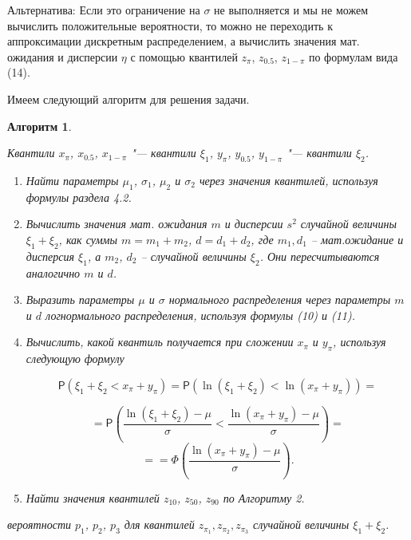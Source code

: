 \documentclass[12pt]{article}
\newtheorem{alg}{Алгоритм}
\newenvironment{pr1}{\par\noindent{\bf Дано:}}{}
\newenvironment{pr3}{\par\noindent{\bf Результат:}}{}
\begin{document}
	Альтернатива:
	Если это ограничение на $\sigma$ не выполняется и мы не можем вычислить положительные вероятности, то можно не переходить к аппроксимации дискретным распределением, а вычислить значения мат. ожидания и дисперсии $\eta$ с помощью квантилей $z_{\pi}$, $z_{0.5}$, $z_{1-\pi}$ по формулам вида (14).
	
	Имеем следующий алгоритм для решения задачи.

	\begin{alg}\label{al3}
		\begin{pr1}
			Квантили $x_{\pi}$, $x_{0.5}$, $x_{1-\pi}$ "--- квантили $\xi_{1}$, $y_{\pi}$, $y_{0.5}$, $y_{1-\pi}$ "--- квантили $\xi_{2}$.
		\end{pr1}
		\begin{enumerate}
			\item Найти параметры $\mu_{1}$, $\sigma_{1}$, $\mu_{2}$ и $\sigma_{2}$ через значения квантилей, используя формулы раздела 4.2.
			\item Вычислить значения мат. ожидания $m$ и дисперсии $s^{2}$ случайной величины $\xi_{1} + \xi_{2}$, как суммы $m = m_{1}+m_{2}$, $d=d_{1} + d_{2}$, где $m_{1}, d_{1}$ -- мат.ожидание и дисперсия $\xi_{1}$, а $m_{2}$, $d_{2}$ -- случайной величины $\xi_{2}$. Они пересчитываются аналогично $m$ и $d$.
			\item Выразить параметры $\mu$ и $\sigma$ нормального распределения через параметры $m$ и $d$ логнормального распределения, используя формулы (10) и (11).
			\item Вычислить, какой квантиль получается при сложении $x_{\pi}$ и $y_{\pi}$, используя следующую формулу
			
			\begin{equation*}
				\mathsf{P}(\xi_{1}+\xi_{2}< x_{\pi}+y_{\pi}) = \mathsf{P}(\ln(\xi_{1}+\xi_{2})<\ln(x_{\pi}+y_{\pi}))=
			\end{equation*}
			
			
			\[=\mathsf{P}\left(\displaystyle{\frac{\ln(\xi_{1}+\xi_{2})-\mu}{\sigma}}<\displaystyle{\frac{\ln(x_{\pi}+y_{\pi})-\mu}{\sigma}}\right)=\]\[= =\Phi\left(\dfrac{\ln(x_{\pi}+y_{\pi})-\mu}{\sigma}\right).\]
			
			
			\item Найти значения квантилей $z_{10}$, $z_{50}$, $z_{90}$ по Алгоритму 2.
		\end{enumerate}
	
		\begin{pr3}\end{pr3} вероятности $p_{1}$, $p_{2}$, $p_{3}$ для квантилей $z_{\pi_{1}}, z_{\pi_{2}}, z_{\pi_{3}}$ случайной величины $\xi_{1} + \xi_{2}$.
		
	\end{alg}
	
\end{document}
